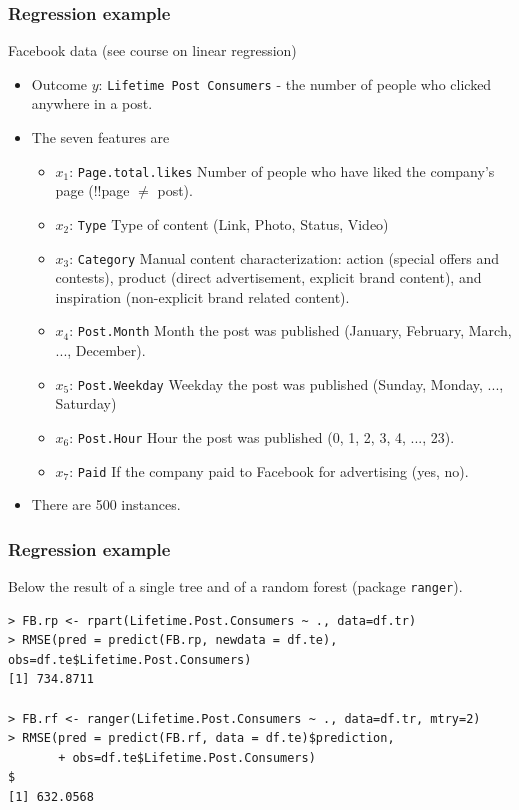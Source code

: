 \begin{frame}
\frametitle{Regression example}
Facebook data (see course on linear regression)
\begin{itemize}
\item Outcome $y$: {\tt Lifetime Post Consumers} - the number of people who clicked anywhere in a post.
\item The seven features are
\begin{itemize}
\scriptsize
\item $x_1$: {\tt Page.total.likes} Number of people who have liked the company's page (!!page $\neq$ post).
\item $x_2$: {\tt Type} Type of content (Link, Photo, Status, Video)
\item $x_3$: {\tt Category} Manual content characterization: action (special offers and contests), product (direct advertisement, explicit brand content), and inspiration (non-explicit brand related content).
\item $x_4$: {\tt Post.Month} Month the post was published (January, February, March, ...,
December).
\item $x_5$: {\tt Post.Weekday} Weekday the post was published (Sunday, Monday, ...,
Saturday)
\item $x_6$: {\tt Post.Hour} Hour the post was published (0, 1, 2, 3, 4, ..., 23).
\item $x_7$: {\tt Paid} If the company paid to Facebook for advertising (yes, no).
\end{itemize}
\item There are 500 instances.
\end{itemize}
\end{frame}
\begin{frame}[fragile]
\frametitle{Regression example}
Below the result of a single tree and of a random forest (package {\tt ranger}).
\scriptsize
\begin{verbatim}
> FB.rp <- rpart(Lifetime.Post.Consumers ~ ., data=df.tr)
> RMSE(pred = predict(FB.rp, newdata = df.te), obs=df.te$Lifetime.Post.Consumers)
[1] 734.8711

> FB.rf <- ranger(Lifetime.Post.Consumers ~ ., data=df.tr, mtry=2)
> RMSE(pred = predict(FB.rf, data = df.te)$prediction,
       + obs=df.te$Lifetime.Post.Consumers)                                                        $
[1] 632.0568
\end{verbatim}
\normalsize
\end{frame}

